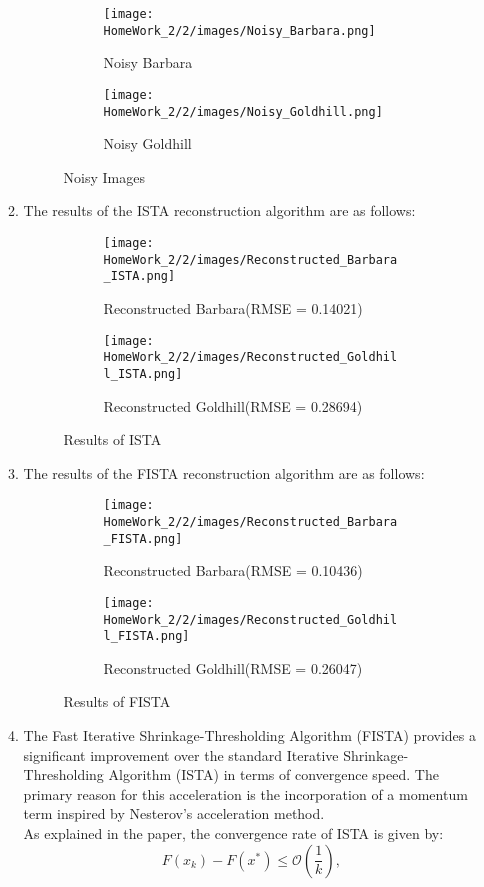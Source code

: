 \documentclass{article}
\begin{document}
\begin{enumerate}
\begin{enumerate}
\begin{figure}[!h]
    \centering
    \begin{subfigure}[b]{0.45\textwidth}
        \centering
        \texttt{[image: HomeWork\_2/2/images/Noisy\_Barbara.png]}
        \caption{Noisy Barbara}
    \end{subfigure}
    \begin{subfigure}[b]{0.45\textwidth}
        \centering
        \texttt{[image: HomeWork\_2/2/images/Noisy\_Goldhill.png]}
        \caption{Noisy Goldhill}
    \end{subfigure}
    \caption{Noisy Images}
\end{figure}
\FloatBarrier
\item The results of the ISTA reconstruction algorithm are as follows:
\begin{figure}[!h]
    \centering
    \begin{subfigure}[b]{0.45\textwidth}
        \centering
        \texttt{[image: HomeWork\_2/2/images/Reconstructed\_Barbara\_ISTA.png]}
        \caption{Reconstructed Barbara(RMSE = 0.14021)}
    \end{subfigure}
    \begin{subfigure}[b]{0.45\textwidth}
        \centering
        \texttt{[image: HomeWork\_2/2/images/Reconstructed\_Goldhill\_ISTA.png]}
        \caption{Reconstructed Goldhill(RMSE = 0.28694)}
    \end{subfigure}
    \caption{Results of ISTA}
\end{figure}
\item The results of the FISTA reconstruction algorithm are as follows:
\begin{figure}[!h]
    \centering
    \begin{subfigure}[b]{0.45\textwidth}
        \centering
        \texttt{[image: HomeWork\_2/2/images/Reconstructed\_Barbara\_FISTA.png]}
        \caption{Reconstructed Barbara(RMSE = 0.10436)}
    \end{subfigure}
    \begin{subfigure}[b]{0.45\textwidth}
        \centering
        \texttt{[image: HomeWork\_2/2/images/Reconstructed\_Goldhill\_FISTA.png]}
        \caption{Reconstructed Goldhill(RMSE = 0.26047)}
    \end{subfigure}
    \caption{Results of FISTA}
\end{figure}
\item 
The Fast Iterative Shrinkage-Thresholding Algorithm (FISTA) provides a significant improvement over the standard Iterative Shrinkage-Thresholding Algorithm (ISTA) in terms of convergence speed. The primary reason for this acceleration is the incorporation of a momentum term inspired by Nesterov's acceleration method.
\\
As explained in the paper, the convergence rate of ISTA is given by:
\begin{equation}
    F(x_k) - F(x^*) \leq \mathcal{O}\left(\frac{1}{k}\right),
\end{equation}


\end{enumerate}
\end{enumerate}
\end{document}
